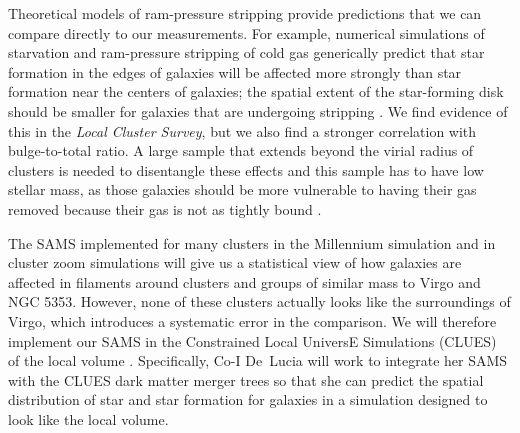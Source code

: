 \documentclass[11pt, preprint]{aastex}
\begin{document}
{%



Theoretical models of ram-pressure stripping provide predictions that
we can compare directly to our measurements.
For example, numerical simulations of starvation and ram-pressure stripping of cold gas 
generically predict that star formation in the edges
of galaxies will be affected more strongly than star formation near the
centers of galaxies; the spatial extent of the star-forming disk
should be smaller for galaxies that are undergoing stripping \citep[e.g.][]{kawata08, bekki14}.
We find evidence of this in the {\it Local Cluster Survey}, but we
also find a stronger correlation with bulge-to-total ratio.  A large sample that extends beyond the virial radius of clusters is needed to disentangle these effects and this sample has to have low stellar mass, as those galaxies should be more
vulnerable to having their gas removed 
because their gas is not as tightly
bound \citep[e.g.][]{kawata08, mccarthy07, bekki14}.


The SAMS implemented for many clusters in the Millennium simulation
and in cluster zoom simulations will give us a statistical view of how
galaxies are affected in filaments around clusters and groups of
similar mass to Virgo and NGC 5353.  However, none of these clusters
actually looks like the surroundings of Virgo, which introduces a
systematic error in the comparison.  We will therefore implement our
SAMS in the Constrained Local UniversE Simulations (CLUES) of the
local volume \citep{Carlesi16}.  Specifically, Co-I De~Lucia will work to integrate her SAMS with the
CLUES  dark matter merger trees so that she can predict the spatial
distribution of star and star formation for galaxies in a simulation designed to look like the local volume.

}
\end{document}
